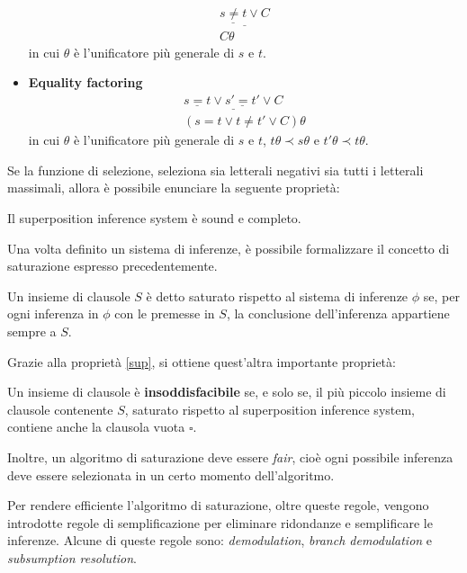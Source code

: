 \begin{definition}
\begin{itemize}
\begin{equation}
\begin{gathered}
                \underline{\underline{s\neq t} \lor C}\\
                C\theta
            \end{gathered}
        \end{equation}
        in cui $\theta$ è l'unificatore più generale di $s$ e $t$.
        \item \textbf{Equality factoring}
        \begin{equation}
            \begin{gathered}
                \underline{\underline{s=t} \lor \underline{s'=t'}\lor C}\\
                (s=t \lor t\neq t' \lor C)\theta
            \end{gathered}
        \end{equation}
        in cui $\theta$ è l'unificatore più generale di $s$ e $t$, $t\theta \prec s\theta$ e $t'\theta\prec t\theta$.
    \end{itemize}
\end{definition}
Se la funzione di selezione, seleziona sia letterali negativi sia tutti i letterali massimali, allora è possibile enunciare la seguente proprietà: 
\begin{property}\label{sup}
    Il superposition inference system è sound e completo.
\end{property}
Una volta definito un sistema di inferenze, è possibile formalizzare il concetto di saturazione espresso precedentemente.
\begin{definition}
    Un insieme di clausole $S$ è detto saturato rispetto al sistema di inferenze $\phi$ se, 
    per ogni inferenza in $\phi$ con le premesse in $S$, la conclusione dell'inferenza appartiene sempre
    a $S$. 
\end{definition}
Grazie alla proprietà \ref{sup}, si ottiene quest'altra importante proprietà:
\begin{property}
    Un insieme di clausole è \textbf{insoddisfacibile} se, e solo se, il più piccolo insieme di clausole contenente $S$, saturato 
    rispetto al superposition inference system, contiene anche la clausola vuota $\square$.
\end{property}
Inoltre, un algoritmo di saturazione deve essere \emph{fair}, cioè ogni possibile inferenza deve essere selezionata
in un certo momento dell'algoritmo.

Per rendere efficiente l'algoritmo di saturazione, oltre queste regole, vengono introdotte
regole di semplificazione per eliminare ridondanze e semplificare le inferenze. Alcune di queste regole sono: \emph{demodulation},
\emph{branch demodulation} e \emph{subsumption resolution}. 

